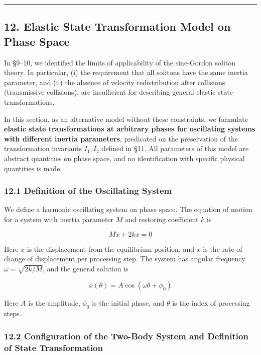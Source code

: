 \documentclass[a4paper,11pt]{article}
\begin{document}
\begin{center}\rule{0.5\linewidth}{0.5pt}\end{center}

\subsection{12. Elastic State Transformation Model on Phase
Space}\label{elastic-state-transformation-model-on-phase-space}

In §9--10, we identified the limits of applicability of the sine-Gordon
soliton theory. In particular, (i) the requirement that all solitons
have the same inertia parameter, and (ii) the absence of velocity
redistribution after collisions (transmissive collisions), are
insufficient for describing general elastic state transformations.

In this section, as an alternative model without these constraints, we
formulate \textbf{elastic state transformations at arbitrary phases for
oscillating systems with different inertia parameters}, predicated on
the preservation of the transformation invariants \(I_1, I_2\) defined
in §11. All parameters of this model are abstract quantities on phase
space, and no identification with specific physical quantities is made.

\subsubsection{12.1 Definition of the Oscillating
System}\label{definition-of-the-oscillating-system}

We define a harmonic oscillating system on phase space. The equation of
motion for a system with inertia parameter \(M\) and restoring
coefficient \(k\) is

\[M\ddot{x} + 2kx = 0 \tag{W12}\]

Here \(x\) is the displacement from the equilibrium position, and
\(\dot{x}\) is the rate of change of displacement per processing step.
The system has angular frequency \(\omega = \sqrt{2k/M}\), and the
general solution is

\[x(\theta) = A\cos(\omega\theta + \phi_0) \tag{W13}\]

Here \(A\) is the amplitude, \(\phi_0\) is the initial phase, and
\(\theta\) is the index of processing steps.

\subsubsection{12.2 Configuration of the Two-Body System and Definition
of State
Transformation}\label{configuration-of-the-two-body-system-and-definition-of-state-transformation}
\end{document}
